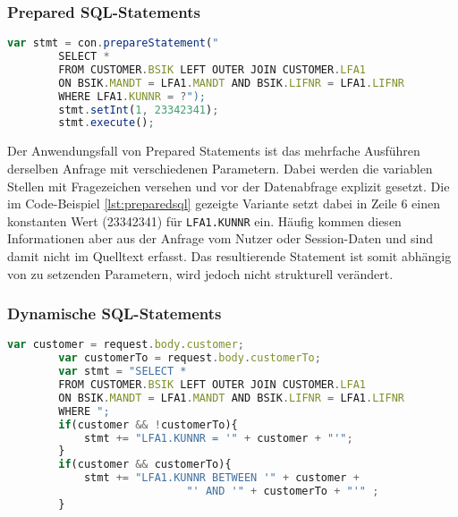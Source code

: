 \subsubsection{Prepared SQL-Statements}

	\begin{lstlisting}[caption={Prepared Statements eingebettet im Quelltext}, label={lst:preparedsql}, language=JavaScript]
		var stmt = con.prepareStatement("
		SELECT *
		FROM CUSTOMER.BSIK LEFT OUTER JOIN CUSTOMER.LFA1
		ON BSIK.MANDT = LFA1.MANDT AND BSIK.LIFNR = LFA1.LIFNR
		WHERE LFA1.KUNNR = ?");
		stmt.setInt(1, 23342341);
		stmt.execute();
	\end{lstlisting}

Der Anwendungsfall von Prepared Statements ist das mehrfache Ausführen derselben Anfrage mit verschiedenen Parametern.
Dabei werden die variablen Stellen mit Fragezeichen versehen und vor der Datenabfrage explizit gesetzt.
Die im Code-Beispiel \ref{lst:preparedsql} gezeigte Variante setzt dabei in Zeile 6 einen konstanten Wert (23342341) für \texttt{LFA1.KUNNR} ein.
Häufig kommen diesen Informationen aber aus der Anfrage vom Nutzer oder Session-Daten und sind damit nicht im Quelltext erfasst.
Das resultierende Statement ist somit abhängig von zu setzenden Parametern, wird jedoch nicht strukturell verändert.

\subsubsection{Dynamische SQL-Statements}

	\begin{lstlisting}[caption={Dynamische SQL-Statements können verschiedene Ausprägungen annehmen.}, label={lst:dynamicsql}, language=JavaScript]
		var customer = request.body.customer;
		var customerTo = request.body.customerTo;
		var stmt = "SELECT *
		FROM CUSTOMER.BSIK LEFT OUTER JOIN CUSTOMER.LFA1
		ON BSIK.MANDT = LFA1.MANDT AND BSIK.LIFNR = LFA1.LIFNR
		WHERE ";
		if(customer && !customerTo){
			stmt += "LFA1.KUNNR = '" + customer + "'";
		}
		if(customer && customerTo){
			stmt += "LFA1.KUNNR BETWEEN '" + customer +
							"' AND '" + customerTo + "'" ;
		}
	\end{lstlisting}

